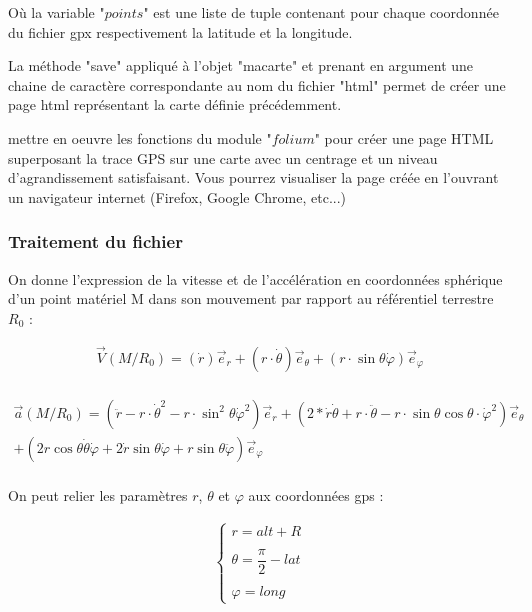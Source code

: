 Où la variable "$points$" est une liste de tuple contenant pour chaque coordonnée du fichier gpx respectivement la latitude et la longitude.

La méthode "save" appliqué à l'objet "macarte" et prenant en argument une chaine de caractère correspondante au nom du fichier "html" permet de créer une page html représentant la carte définie précédemment.

\question{} mettre en oeuvre les fonctions du module "$folium$" pour créer une page HTML superposant la trace GPS sur une carte avec un centrage et un niveau d'agrandissement satisfaisant. Vous pourrez visualiser la page créée en l'ouvrant un navigateur internet (Firefox, Google Chrome, etc...)


\subsubsection*{Traitement du fichier}

On donne l'expression de la vitesse et de l'accélération en coordonnées sphérique d'un point matériel M dans son mouvement par rapport au référentiel terrestre $R_0$ : 

\begin{align*}
\overrightarrow{V}(M/R_0)=\left(\dot{r}\right)\overrightarrow{e}_r+\left(r\cdot \dot{\theta}\right)\overrightarrow{e}_{\theta}+\left(r\cdot \sin\theta\dot{\varphi}\right)\overrightarrow{e}_{\varphi}\\
\end{align*}

\begin{align*}
\overrightarrow{a}(M/R_0)=\left(\ddot{r}-r\cdot \dot{\theta}^2-r\cdot \sin^2\theta\dot{\varphi}^2\right)\overrightarrow{e}_r+\left(2*\dot{r}\dot{\theta}+r\cdot \ddot{\theta}-r\cdot \sin\theta\cos\theta\cdot \dot{\varphi}^2\right)\overrightarrow{e}_{\theta}\\
+
\left(2 r\cos\theta\dot{\theta}\dot{\varphi}+2\dot{r}\sin\theta\dot{\varphi}+r\sin\theta\ddot{\varphi}\right)\overrightarrow{e}_{\varphi}\\
\end{align*}

On peut relier les paramètres $r$, $\theta$ et $\varphi$ aux coordonnées gps : 

\begin{align*}
\left\{
\begin{array}{c}
r=alt+R\\
\\
\theta=\dfrac{\pi}{2}-lat\\
\\
\varphi=long
\end{array}
\right.
\end{align*}

